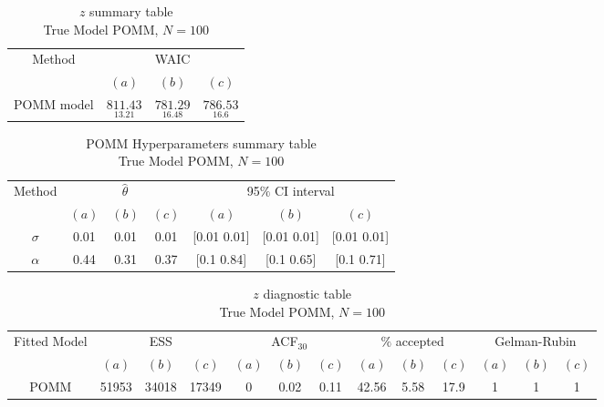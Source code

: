 \documentclass[11pt]{amsart}
\begin{document}
\begin{table}[htbp]
\centering
\caption*{
{\large $z$ summary table} \\ 
{\small True Model POMM, $N=100$}
} 
\begin{tabular}{cccc}
\toprule
\multirow{2}{*}{Method}  &\multicolumn{3}{c}{WAIC} \\
\cmidrule(lr){2-4}
& $(a)$ & $(b)$ & $(c)$  \\
\midrule
POMM model  &$\underset{13.21}{811.43}$ & $\underset{16.48}{781.29}$ & $\underset{16.6}{786.53}$  \\  
\bottomrule
\end{tabular}
\label{table:simulations_from_simple}
\end{table}


\begin{table}[htbp]
\centering
\caption*{
{\large POMM Hyperparameters summary table} \\ 
{\small True Model POMM, $N=100$}
} 
\begin{tabular}{ccccccc}
\toprule
\multirow{2}{*}{Method} & \multicolumn{3}{c}{
$\hat{\theta}$} & \multicolumn{3}{c}{
95$\%$ CI interval}  \\
\cmidrule(lr){2-4} \cmidrule(lr){5-7} 
& $(a)$ & $(b)$ & $(c)$ & $(a)$ & $(b)$ & $(c)$  \\
\midrule
$\sigma$ &0.01 & 0.01 & 0.01 & [0.01	0.01] & [0.01	0.01] & [0.01	0.01]   \\
$\alpha$ & 0.44 & 0.31 & 0.37 & [0.1	0.84] & [0.1	0.65] & [0.1	0.71]  \\
\bottomrule
\end{tabular}
\label{table:simulations_from_simple}
\end{table}








\begin{table}[htbp]
\centering
\caption*{
{\large $z$ diagnostic table} \\ 
{\small True Model POMM, $N=100$}
} 
\begin{tabular}{ccccccccccccc}
\toprule
\multirow{2}{*}{Fitted Model} & \multicolumn{3}{c}{ESS} & \multicolumn{3}{c}{
ACF$_{30}$} & \multicolumn{3}{c}{$\%$ accepted} & \multicolumn{3}{c}{Gelman-Rubin}\\
\cmidrule(lr){2-4} \cmidrule(lr){5-7} \cmidrule(lr){8-10} \cmidrule(lr){11-13} 
& $(a)$ & $(b)$ & $(c)$ & $(a)$ & $(b)$ & $(c)$ & $(a)$ & $(b)$ & $(c)$ & $(a)$ & $(b)$ & $(c)$ \\
\midrule
POMM &51953 & 34018 & 17349 & 0 & 0.02 & 0.11 & 42.56 & 5.58 & 17.9 & 1 & 1 & 1     \\
\bottomrule
\end{tabular}
\label{table:simulations_from_simple}
\end{table}
\end{document}
